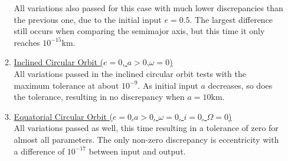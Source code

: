 \begin{itemize}
\begin{enumerate}
		All variations also passed for this case with much lower discrepancies than the previous one, due to the initial input $e=0.5$. The largest difference still occurs when comparing the semimajor axis, but this time it only reaches $10^{-15}$km. %
		\item \underline{Inclined Circular Orbit ($e=0$, \quad $a>0$,\quad $\omega=0$)}\\
		All variations passed in the inclined circular orbit tests with the maximum tolerance at about $10^{-9}$. As initial input $a$ decreases, so does the tolerance, resulting in no discrepancy when $a=10$km. %
		\item \underline{Equatorial Circular Orbit ($e=0$,\quad $a>0$, \quad $\omega=0$, \quad $i=0$, \quad $\Omega=0$)}\\
		All variations passed as well, this time resulting in a tolerance of zero for almost all parameters. The only non-zero discrepancy is eccentricity with a difference of $10^{-17}$ between input and output. %

\end{enumerate}
\end{itemize}
